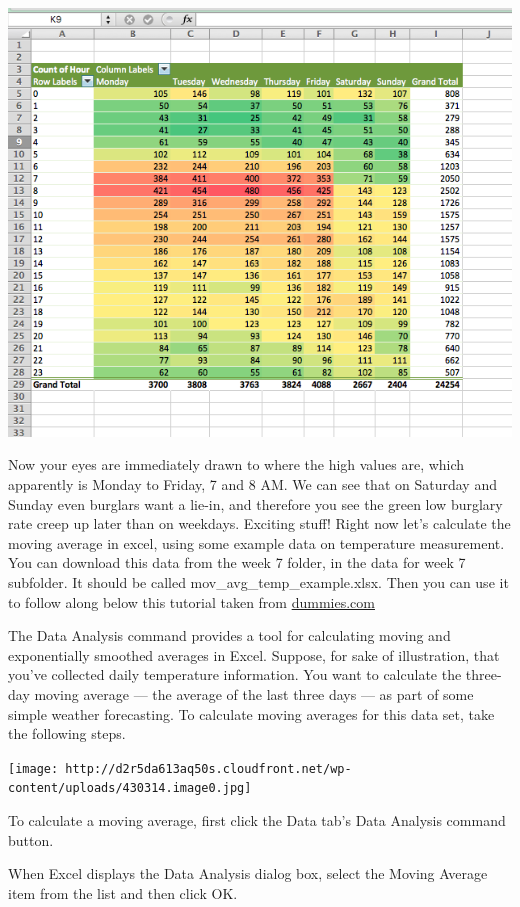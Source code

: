\documentclass[]{book}
\theoremstyle{definition}
\theoremstyle{definition}
\theoremstyle{definition}
\theoremstyle{remark}
\begin{document}
\includegraphics{imgs/cond_3.png}

Now your eyes are immediately drawn to where the high values are, which
apparently is Monday to Friday, 7 and 8 AM. We can see that on Saturday
and Sunday even burglars want a lie-in, and therefore you see the green
low burglary rate creep up later than on weekdays. Exciting stuff! Right
now let's calculate the moving average in excel, using some example data
on temperature measurement. You can download this data from the week 7
folder, in the data for week 7 subfolder. It should be called
mov\_avg\_temp\_example.xlsx. Then you can use it to follow along below
this tutorial taken from
\href{http://www.dummies.com/software/microsoft-office/excel/how-to-calculate-moving-averages-in-excel/}{dummies.com}

The Data Analysis command provides a tool for calculating moving and
exponentially smoothed averages in Excel. Suppose, for sake of
illustration, that you've collected daily temperature information. You
want to calculate the three-day moving average --- the average of the
last three days --- as part of some simple weather forecasting. To
calculate moving averages for this data set, take the following steps.

\texttt{[image: http://d2r5da613aq50s.cloudfront.net/wp-content/uploads/430314.image0.jpg]}

To calculate a moving average, first click the Data tab's Data Analysis
command button.

When Excel displays the Data Analysis dialog box, select the Moving
Average item from the list and then click OK.
\end{document}
